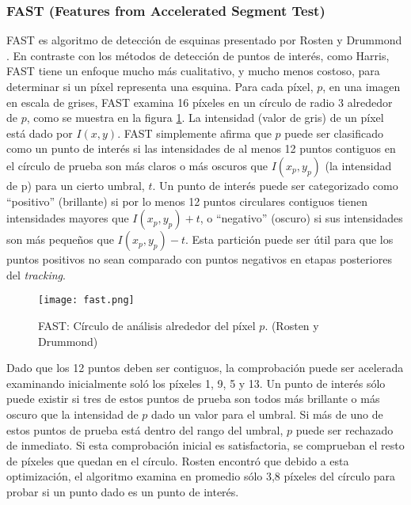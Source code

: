 \subsubsection{FAST (Features from Accelerated Segment Test)} 
FAST es algoritmo de detección de esquinas presentado por Rosten y Drummond \cite{Rosten}. En contraste con los métodos de detección de puntos de interés, como Harris, FAST tiene un enfoque mucho más cualitativo, y mucho menos costoso, para determinar si un píxel representa una esquina. Para cada píxel, $p$, en una imagen en escala de grises, FAST examina 16 píxeles en un círculo de radio 3 alrededor de $p$, como se muestra en la figura \ref{fig:fast}. La intensidad (valor de gris) de un píxel está dado por $I(x, y)$. FAST simplemente afirma que $p$ puede ser clasificado como un punto de interés si las intensidades de al menos 12 puntos contiguos en el círculo de prueba son más claros o más oscuros que $I(x_p, y_p)$ (la intensidad de p) para un cierto  umbral, $t$. Un punto de interés puede ser categorizado como ``positivo'' (brillante) si por lo menos 12 puntos circulares contiguos tienen intensidades mayores que $I(x_p, y_p) + t$, o ``negativo'' (oscuro) si sus intensidades son más pequeños que $I(x_p , y_p) - t$. Esta partición puede ser útil para que los puntos positivos no sean comparado con puntos negativos en etapas posteriores del \textit{tracking}.

\begin{figure}
  \centering
  \texttt{[image: fast.png]}
  \caption{FAST: Círculo de análisis alrededor del píxel $p$. (Rosten y Drummond)
  }
  \label{fig:fast}
\end{figure}

Dado que los 12 puntos deben ser contiguos, la comprobación puede ser acelerada examinando inicialmente soló los píxeles 1, 9, 5 y 13. Un punto de interés sólo puede existir si tres de estos puntos de prueba son todos más brillante o más oscuro que la intensidad de $p$ dado un valor para el umbral. Si más de uno de estos puntos de prueba está  dentro del rango del umbral, $p$ puede ser rechazado de inmediato. Si esta comprobación inicial es satisfactoria, se comprueban el resto de píxeles que quedan en el círculo. Rosten encontró que debido a esta optimización, el algoritmo examina en promedio sólo 3,8 píxeles del círculo para probar si un punto dado es un punto de interés.

